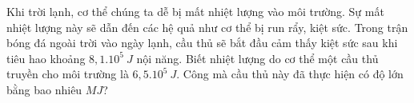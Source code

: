 \begin{ex}%
	Khi trời lạnh, cơ thể chúng ta dễ bị mất nhiệt lượng vào môi trường. Sự mất nhiệt lượng này sẽ dẫn đến các hệ quả như cơ thể bị run rẩy, kiệt sức. Trong trận bóng đá ngoài trời vào ngày lạnh, cầu thủ sẽ bắt đầu cảm thấy kiệt sức sau khi tiêu hao khoảng $8,1.10^5\ J$ nội năng. Biết nhiệt lượng do cơ thể một cầu thủ truyền cho môi trường là $6,5.10^5\ J$. Công mà cầu thủ này đã thực hiện có độ lớn bằng bao nhiêu $MJ$?	
\end{ex}
